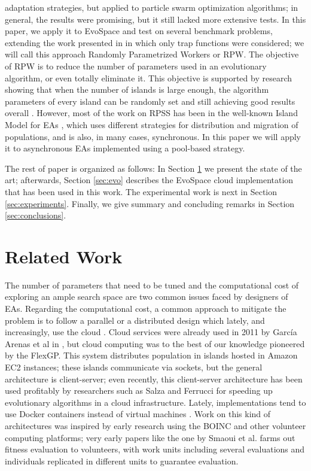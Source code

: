 \documentclass[conference]{IEEEtran}
\begin{document}
adaptation strategies, but applied to particle swarm optimization
algorithms; in general, the results were promising, but it still lacked more extensive tests.
In this paper, we apply it to EvoSpace and test on
several benchmark problems, extending the work presented in \cite{LNCS86720702}
in which only trap functions were considered; we will call this
approach Randomly Parametrized Workers or RPW. The objective of RPW is
to reduce the number of parameters used in an evolutionary algorithm,
or even totally eliminate it. This objective is supported by research
showing that when the number of islands 
is large enough, the algorithm parameters of every island can be randomly
set and still achieving good results overall \cite{fuku2}. 
However, most of the work on 
RPSS has been in the well-known Island Model for EAs
\cite{ALBA2001451}, which uses different strategies for distribution
and migration of populations, and is also, in many cases, synchronous.
In this paper we will apply 
it to asynchronous EAs implemented using a pool-based strategy.

The rest of paper is organized as follows: In Section \ref{sec:work} we
present the state of the art; afterwards, Section \ref{sec:evo} describes the
EvoSpace cloud implementation that has been used in this work. The
experimental work is next in 
Section \ref{sec:experiments}. Finally, we give summary and concluding remarks in
Section \ref{sec:conclusions}.

\section{Related Work}
\label{sec:work}

The number of parameters that need to be tuned and the computational
cost of exploring an ample search space are two common issues faced by
designers of EAs. Regarding the computational cost, a common approach
to mitigate the problem is to follow a parallel or a distributed
design \cite{cantu-paz:migration-policies,duda2013gpu} which lately,
and increasingly, use the cloud \cite{10.1007/978-3-319-45823-6_8}. Cloud services were already
used in 2011 by Garc\'ia Arenas et al in
\cite{DBLP:conf/gecco/ArenasGCLRM11}, but cloud computing was to the
best of our knowledge pioneered by  the FlexGP. This system
distributes population in islands hosted in Amazon EC2 instances;
these islands communicate via sockets, but the general architecture
is client-server; even recently, this client-server architecture has been
used profitably by researchers such as Salza and Ferrucci
\cite{SALZA2019276} for speeding up evolutionary algorithms in a cloud
infrastructure. Lately, implementations tend to use Docker containers
instead of virtual machines \cite{Dziurzanski2020}. Work on this kind
of architectures was inspired by early research using the BOINC and
other volunteer computing platforms; very early papers like the one by
Smaoui et al. \cite{FekiNG09} farms out fitness evaluation to
volunteers, with work units including several evaluations and
individuals replicated in different units to guarantee evaluation.
\end{document}
